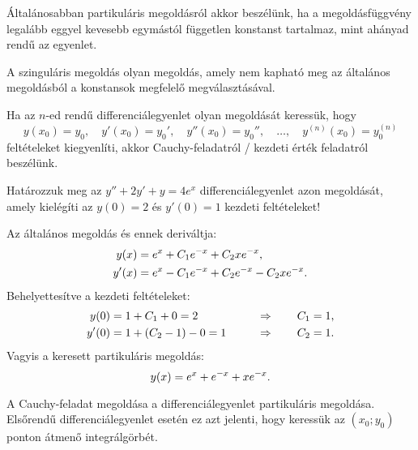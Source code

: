 \begin{note}
  Általánosabban partikuláris megoldásról akkor beszélünk, ha a megoldásfüggvény
  legalább eggyel kevesebb egymástól független konstanst tartalmaz, mint ahányad
  rendű az egyenlet.
\end{note}

\begin{definition}
  A szinguláris megoldás olyan megoldás, amely nem kapható meg az általános
  megoldásból a konstansok megfelelő megválasztásával.
\end{definition}

\begin{definition}
  Ha az $n$-ed rendű differenciálegyenlet olyan megoldását keressük, hogy
  $$
    y(x_0) = y_0, \quad
    y'(x_0) = y_0', \quad
    y''(x_0) = y_0'', \quad
    \dots, \quad
    y^{(n)}(x_0) = y_0^{(n)}
  $$
  feltételeket kiegyenlíti, akkor Cauchy-feladatról / kezdeti érték feladatról
  beszélünk.
\end{definition}

\begin{example}
  Határozzuk meg az $y'' + 2y' + y = 4e^x$ differenciálegyenlet azon megoldását,
  amely kielégíti az $y(0) = 2$ és $y'(0) = 1$ kezdeti feltételeket!

  \boxrule

  Az általános megoldás és ennek deriváltja:
  $$
    \begin{aligned}
      y(x)  & = e^x + C_1 e^{-x} + C_2 x e^{-x} \text,
      \\
      y'(x) & = e^x - C_1 e^{-x} + C_2 e^{-x} - C_2 x e^{-x} \text.
    \end{aligned}
  $$
  Behelyettesítve a kezdeti feltételeket:
  $$
    \begin{aligned}
      y(0)  & = 1 + C_1 + 0 = 2
            & \qquad \Rightarrow \qquad C_1 = 1 \text,
      \\
      y'(0) & = 1 + (C_2 - 1) - 0 = 1
            & \qquad \Rightarrow \qquad C_2 = 1 \text.
    \end{aligned}
  $$
  Vagyis a keresett partikuláris megoldás:
  $$
    y(x) = e^x + e^{-x} + x e^{-x}
    \text.
  $$
\end{example}

\begin{note}[][nobreak]
  A Cauchy-feladat megoldása a differenciálegyenlet partikuláris megoldása.
  Elsőrendű differenciálegyenlet esetén ez azt jelenti, hogy keressük az
  $(x_0; y_0)$ ponton átmenő integrálgörbét.
\end{note}

